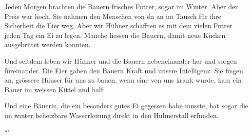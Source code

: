 {Jeden Morgen brachten die Bauern frisches Futter, sogar im Winter. Aber der
Preis war hoch. Sie nahmen den Menschen von da an im Tausch für ihre Sicherheit
die Eier weg. Aber wir Hühner schafften es mit dem vielen Futter jeden Tag ein
Ei zu legen. Manche liessen die Bauern, damit neue Kücken ausgebrütet werden
konnten.

Und seitdem leben wir Hühner und die Bauern nebeneinander her und sorgen
füreinander. Die Eier gaben den Bauern Kraft und unsere Intelligenz. Sie fingen
an, grössere Häuser für uns zu bauen, wenn eine von uns krank wurde, kam ein
Bauer im weissen Kittel und half. 

Und eine Bäuerin, die ein besonders gutes Ei gegessen habe musste, hat sogar
die im winter beheizbare Wasserleitung direkt in den Hühnerstall erfunden. }




\enquote{}


\vfill
